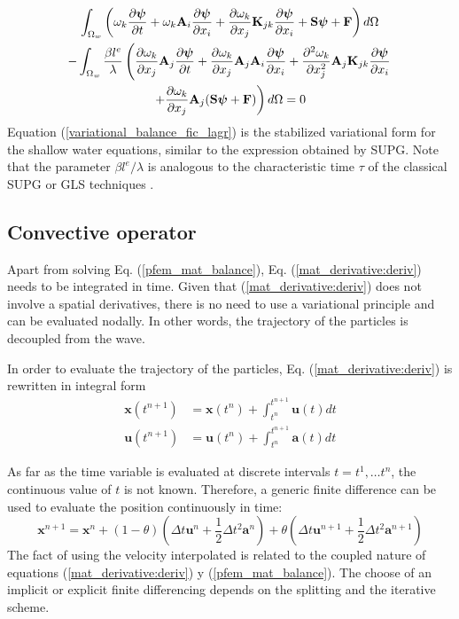 \begin{multline} \label{variational_balance_fic_lagr}
\int_{\Omega_w} \left(
    \omega_k \frac{\partial\bm{\psi}}{\partial t} + \omega_k \mathbf{A}_i\frac{\partial\bm{\psi}}{\partial x_i}
    + \frac{\partial\omega_k}{\partial x_j} \mathbf{K}_{jk} \frac{\partial\bm{\psi}}{\partial x_i} + \mathbf{S}\bm{\psi} + \mathbf{F}
\right) d\Omega\\ -
\int_{\Omega_w} \frac{\beta l^e}{\lambda} \left(
    \frac{\partial\omega_k}{\partial x_j} \mathbf{A}_j \frac{\partial\bm{\psi}}{\partial t}
    + \frac{\partial\omega_k}{\partial x_j} \mathbf{A}_j\mathbf{A}_i\frac{\partial\bm{\psi}}{\partial x_i}
    + \frac{\partial^2\omega_k}{\partial x_j^2} \mathbf{A}_j\mathbf{K}_{jk} \frac{\partial\bm{\psi}}{\partial x_i} \right. \\
    \left.
    + \frac{\partial\omega_k}{\partial x_j} \mathbf{A}_j(\mathbf{S}\bm{\psi} + \mathbf{F})
\right) d\Omega
=0
\end{multline}
Equation (\ref{variational_balance_fic_lagr}) is the stabilized variational form for the shallow water equations, similar to the expression obtained by SUPG. Note that the parameter $\beta l^e/\lambda$ is analogous to the characteristic time $\tau$ of the classical SUPG or GLS techniques \cite{cotela2016}.



\subsection{Convective operator}


Apart from solving Eq. (\ref{pfem_mat_balance}), Eq. (\ref{mat_derivative:deriv}) needs to be integrated in time. Given that (\ref{mat_derivative:deriv}) does not involve a spatial derivatives, there is no need to use a variational principle and can be evaluated nodally. In other words, the trajectory of the particles is decoupled from the wave.

In order to evaluate the trajectory of the particles, Eq. (\ref{mat_derivative:deriv}) is rewritten in integral form
\begin{subequations}
\begin{align}
    \mathbf{x}(t^{n+1}) &= \mathbf{x}(t^n) + \int_{t^n}^{t^{n+1}} \mathbf{u}(t) dt \\
    \mathbf{u}(t^{n+1}) &= \mathbf{u}(t^n) + \int_{t^n}^{t^{n+1}} \mathbf{a}(t) dt
\end{align}
\end{subequations}


As far as the time variable is evaluated at discrete intervals $t = t^1, \dots t^n$, the continuous value of $t$ is not known. Therefore, a generic finite difference can be used to evaluate the position continuously in time:
\begin{equation}
    \mathbf{x}^{n+1} = \mathbf{x}^n +
        (1-\theta) (\Delta t \mathbf{u}^n + \frac{1}{2} \Delta t^2 \mathbf{a}^n) +
        \theta (\Delta t \mathbf{u}^{n+1} + \frac{1}{2} \Delta t^2 \mathbf{a}^{n+1})
\end{equation}
The fact of using the velocity interpolated is related to the coupled nature of equations (\ref{mat_derivative:deriv}) y (\ref{pfem_mat_balance}). The choose of an implicit or explicit finite differencing depends on the splitting and the iterative scheme.





